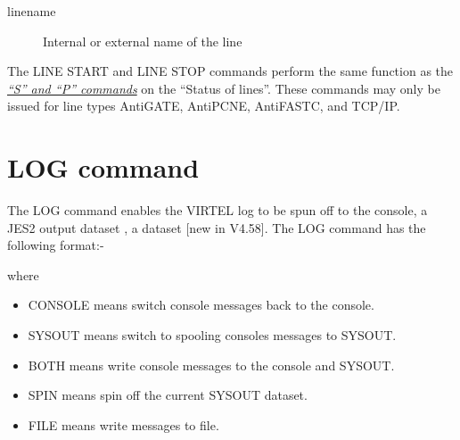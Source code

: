 \documentclass[letterpaper,10pt,english]{sphinxmanual}
\begin{document}
\begin{sphinxVerbatim}[commandchars=\\\{\}]
  


  
\end{sphinxVerbatim}
\begin{description}
\item[{linename}] \leavevmode
Internal or external name of the line

\end{description}

The LINE START and LINE STOP commands perform the same function as the {\hyperref[\detokenize{audit_operations_ and_performance:_bookmark12}]{\emph{“S” and “P” commands}}} on the “Status of lines”. These commands may only be issued for line types AntiGATE, AntiPCNE, AntiFASTC, and TCP/IP.


\section{LOG command}
\label{\detokenize{audit_operations_ and_performance:index-8}}\label{\detokenize{audit_operations_ and_performance:log-command}}
The LOG command enables the VIRTEL log to be spun off to the console, a JES2 output dataset , a dataset {[}new in V4.58{]}. The LOG command has the following format:-

\begin{sphinxVerbatim}[commandchars=\\\{\}]
         
\end{sphinxVerbatim}

where
\begin{itemize}
\item {} 
CONSOLE means switch console messages back to the console.

\item {} 
SYSOUT means switch to spooling consoles messages to SYSOUT.

\item {} 
BOTH means write console messages to the console and SYSOUT.

\item {} 
SPIN means spin off the current SYSOUT dataset.

\item {} 
FILE means write messages to file.

\end{itemize}
\end{document}
